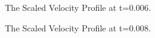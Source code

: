 \documentclass{article}
\begin{document}
  \begin{figure}[H]
    \centering
    \noindent{}
    \caption{The Scaled Velocity Profile at t=0.006.} \label{fig:22}
  \end{figure}
  
  \begin{figure}[H]
    \centering
    \noindent{}
    \caption{The Scaled Velocity Profile at t=0.008.} \label{fig:33}
  \end{figure}
  
\end{document}
